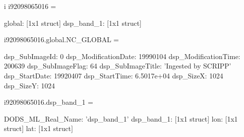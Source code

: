 \begin{vcode}{i}
i92098065016 = 

        global: [1x1 struct]
    dsp_band_1: [1x1 struct]

i92098065016.global.NC_GLOBAL =

          dsp_SubImageId: 0
    dsp_ModificationDate: 19990104
    dsp_ModificationTime: 200639
        dsp_SubImageFlag: 64
       dsp_SubImageTitle: 'Ingested by SCRIPP'
           dsp_StartDate: 19920407
           dsp_StartTime: 6.5017e+04
               dsp_SizeX: 1024
               dsp_SizeY: 1024

i92098065016.dsp_band_1 =

  DODS_ML_Real_Name: 'dsp_band_1'
         dsp_band_1: [1x1 struct]
                lon: [1x1 struct]
                lat: [1x1 struct]
\end{vcode}
